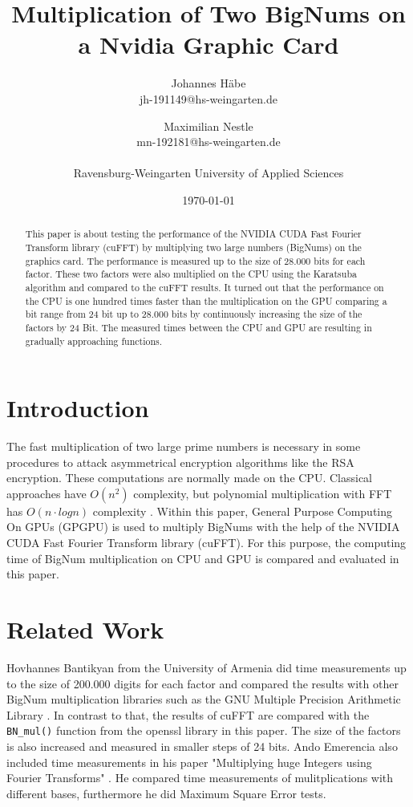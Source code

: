 \documentclass[12pt,a4paper]{article}
\title{Multiplication of Two BigNums on a Nvidia Graphic Card}
\author{Johannes H\"abe  \\
	jh-191149@hs-weingarten.de
	\and 
	Maximilian Nestle \\
	mn-192181@hs-weingarten.de \\\\
	Ravensburg-Weingarten University of Applied Sciences
	}
\date{\today}
\begin{document}
\maketitle
%
\begin{abstract}
This paper is about testing the performance of the NVIDIA CUDA Fast Fourier Transform library (cuFFT) by multiplying two large numbers (BigNums) on the graphics card. The performance is measured up to the size of 28.000 bits for each factor. These two factors were also multiplied on the CPU using the Karatsuba algorithm and compared to the cuFFT results. It turned out that the performance on the CPU is one hundred times faster than the multiplication on the GPU comparing a bit range from 24 bit up to 28.000 bits by continuously increasing the size of the factors by 24 Bit. The measured times between the CPU and GPU are resulting in gradually approaching functions.
\end{abstract}

\section{Introduction}
The fast multiplication of two large prime numbers is necessary in some procedures to attack asymmetrical encryption algorithms like the RSA encryption. These computations are normally made on the CPU. Classical approaches have $O(n^2)$ complexity, but polynomial multiplication with FFT has $O(n \cdot logn)$ complexity \cite{bantikyan2014big}. Within this paper, General Purpose Computing On GPUs (GPGPU) is used to multiply BigNums with the help of the NVIDIA CUDA Fast Fourier Transform library (cuFFT). For this purpose, the computing time of BigNum multiplication on CPU and GPU is compared and evaluated in this paper.

\section{Related Work}
Hovhannes Bantikyan from the University of Armenia did time measurements up to the size of 200.000 digits for each factor and compared the results with other BigNum multiplication libraries such as the GNU Multiple Precision Arithmetic Library \cite{bantikyan2014big}. In contrast to that, the results of cuFFT are compared with the \texttt{BN_mul()} function from the openssl library in this paper. The size of the factors is also increased and measured in smaller steps of 24 bits. Ando Emerencia also included time measurements in his paper "Multiplying huge Integers using Fourier Transforms" \cite{emerencia2007multiplying}. He compared time measurements of mulitplications with different bases, furthermore he did Maximum Square Error tests.
\end{document}
